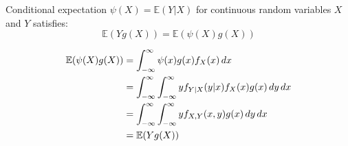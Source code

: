 \documentclass{huhtakm-template-book}
\newcommand{\expect}{\mathbb{E}}
\begin{document}
    \begin{lem}
        Conditional expectation $\psi(X)=\expect(Y|X)$ for continuous random variables $X$ and $Y$ satisfies:
        \begin{equation*}
            \expect(Yg(X))=\expect(\psi(X)g(X))
        \end{equation*}
    \end{lem}
    \begin{proofing}
        \begin{align*}
            \expect(\psi(X)g(X))&=\intinfty\psi(x)g(x)f_{X}(x)\,dx\\
            &=\intinfty\intinfty yf_{Y|X}(y|x)f_{X}(x)g(x)\,dy\,dx\\
            &=\intinfty\intinfty yf_{X,Y}(x,y)g(x)\,dy\,dx\\
            &=\expect(Yg(X))
        \end{align*}
    \end{proofing}
    
\end{document}
